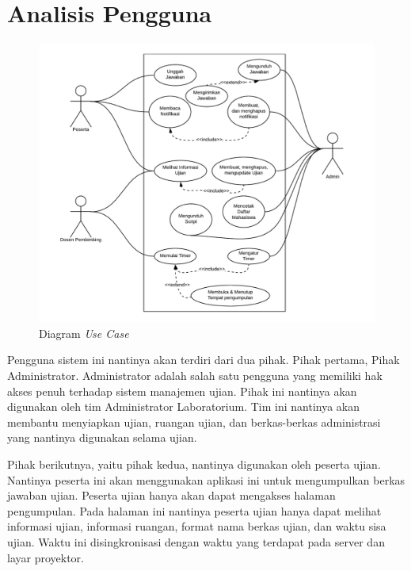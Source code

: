 \section{Analisis Pengguna}

\begin{figure}
    \centering
    \includegraphics[width=0.75\paperwidth]{Gambar/diagram-usecase.pdf}
    \caption{Diagram \textit{Use Case}}
    \label{fig:my_label}
\end{figure}

Pengguna sistem ini nantinya akan terdiri dari dua pihak. Pihak pertama, Pihak Administrator. Administrator adalah salah satu pengguna yang memiliki hak akses penuh terhadap sistem manajemen ujian. Pihak ini nantinya akan digunakan oleh tim Administrator Laboratorium. Tim ini nantinya akan membantu menyiapkan ujian, ruangan ujian, dan berkas-berkas administrasi yang nantinya digunakan selama ujian.

Pihak berikutnya, yaitu pihak kedua, nantinya digunakan oleh peserta ujian. Nantinya peserta ini akan menggunakan aplikasi ini untuk mengumpulkan berkas jawaban ujian. Peserta ujian hanya akan dapat mengakses halaman pengumpulan. Pada halaman ini nantinya peserta ujian hanya dapat melihat informasi ujian, informasi ruangan, format nama berkas ujian, dan waktu sisa ujian. Waktu ini disingkronisasi dengan waktu yang terdapat pada server dan layar proyektor.